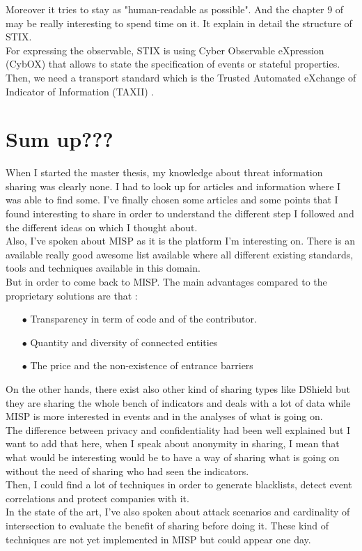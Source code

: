 \documentclass{eplmastersthesis}
\begin{document}
 Moreover it tries to stay as "human-readable as possible". And the chapter 9 of \cite{barnum2012standardizing} may be really interesting to spend time on it. It explain in detail the structure of STIX.\\
 For expressing the observable, STIX is using Cyber Observable eXpression (CybOX)\cite{barnum2012cybox} that allows to state the specification of events or stateful properties.
Then, we need a transport standard which is the Trusted Automated eXchange of Indicator of Information (TAXII) \cite{connolly2014trusted} .

\section{Sum up???}
When I started the master thesis, my knowledge about threat information sharing was clearly none. I had to look up for articles and information where I was able to find some. I've finally chosen some articles and some points that I found interesting to share in order to understand the different step I followed and the different ideas on which I thought about.\\
Also, I've spoken about MISP as it is the platform I'm interesting on. There is an available really good awesome list \cite{AwesomeTreat} available where all different existing standards, tools and techniques available in this domain.\\
But in order to come back to MISP. The main advantages compared to the proprietary solutions are that :
\begin{itemize}
\item[$\bullet$] Transparency in term of code and of the contributor.
\item[$\bullet$] Quantity and diversity of connected entities
\item[$\bullet$] The price and the non-existence of entrance barriers
\end{itemize}
On the other hands, there exist also other kind of sharing types like DShield but they are sharing the whole bench of indicators and deals with a lot of data while MISP is more interested in events and in the analyses of what is going on.\\

The difference between privacy and confidentiality had been well explained but I want to add that here, when I speak about anonymity in sharing, I mean that what would be interesting would be to have a way of sharing what is going on without the need of sharing who had seen the indicators.\\
Then, I could find a lot of techniques in order to generate blacklists, detect event correlations and protect companies with it.\\
In the state of the art, I've also spoken about attack scenarios and cardinality of intersection to evaluate the benefit of sharing before doing it. These kind of techniques are not yet implemented in MISP but could appear one day.\\
\end{document}
